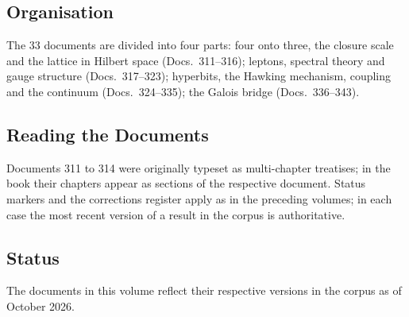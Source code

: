 \subsection*{Organisation}

The 33 documents are divided into four parts: four onto three, the closure
scale and the lattice in Hilbert space (Docs.~311--316); leptons, spectral
theory and gauge structure (Docs.~317--323); hyperbits, the Hawking
mechanism, coupling and the continuum (Docs.~324--335); the Galois bridge
(Docs.~336--343).

\subsection*{Reading the Documents}

Documents 311 to 314 were originally typeset as multi-chapter treatises; in
the book their chapters appear as sections of the respective document. Status
markers and the corrections register apply as in the preceding volumes; in
each case the most recent version of a result in the corpus is authoritative.

\subsection*{Status}

The documents in this volume reflect their respective versions in the corpus
as of October 2026.
